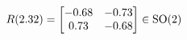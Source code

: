 \documentclass[preview]{standalone}
\begin{document}
\begin{align*}
\special{dvisvgm:raw <g id='unique000'>}R(2.32) = \begin{bmatrix} -0.68 & -0.73 \\ 0.73 & -0.68 \end{bmatrix} \in \text{SO}(2)\special{dvisvgm:raw </g>}
\end{align*}
\end{document}
